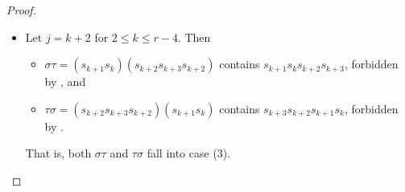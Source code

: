 \documentclass{amsart}
\theoremstyle{definition}
\begin{document}
\begin{appendices}
\begin{proof}
\begin{itemize}
\begin{itemize}
        \end{itemize}
        That is, both $\sigma\tau$ and $\tau\sigma$ fall into case (3).
        \item Let $j=k+2$ for $2\leq k\leq r-4$. Then \begin{itemize}
            \item $\sigma\tau=(s_{k+1}s_k)(s_{k+2}s_{k+3}s_{k+2})$ contains $s_{k+1}s_ks_{k+2}s_{k+3}$, forbidden by , and
            \item $\tau\sigma=(s_{k+2}s_{k+3}s_{k+2})(s_{k+1}s_k)$ contains $s_{k+3}s_{k+2}s_{k+1}s_k$, forbidden by .
        \end{itemize}
        That is, both $\sigma\tau$ and $\tau\sigma$ fall into case (3).
    \end{itemize}


\end{proof}
\end{appendices}
\end{document}
